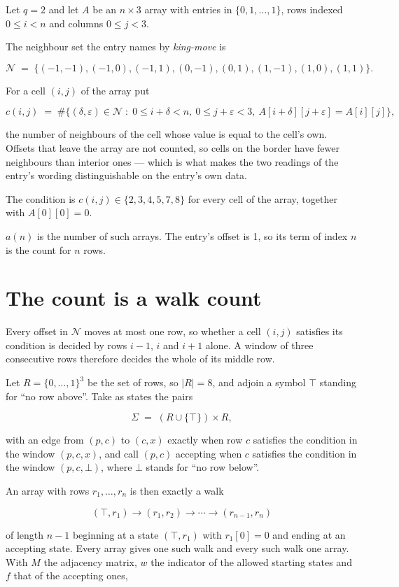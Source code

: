 \documentclass[11pt]{article}
\theoremstyle{definition}
\begin{document}
Let $q = 2$ and let $A$ be an $n \times 3$ array with entries in $\{0,1,\dots,1\}$, rows indexed $0 \le i < n$ and columns $0 \le j < 3$.

The neighbour set the entry names by {\itshape king-move} is

\[\mathcal{N} \;=\; \{(-1,-1), (-1,0), (-1,1), (0,-1), (0,1), (1,-1), (1,0), (1,1)\}.\]

For a cell $(i,j)$ of the array put

\[c(i,j) \;=\; \#\bigl\{(\delta,\varepsilon)\in\mathcal{N} \;:\; 0\le i+\delta<n,\ 0\le j+\varepsilon<3,\ A[i+\delta][j+\varepsilon] = A[i][j]\bigr\},\]

the number of neighbours of the cell whose value is equal to the cell's own. Offsets that leave the array are not counted, so cells on the border have fewer neighbours than interior ones --- which is what makes the two readings of the entry's wording distinguishable on the entry's own data.

The condition is $c(i,j) \in \{2, 3, 4, 5, 7, 8\}$ for every cell of the array, together with $A[0][0]=0$.

$a(n)$ is the number of such arrays. The entry's offset is 1, so its term of index $n$ is the count for $n$ rows.

\section{The count is a walk count}

Every offset in $\mathcal{N}$ moves at most one row, so whether a cell $(i,j)$ satisfies its condition is decided by rows $i-1$, $i$ and $i+1$ alone. A window of three consecutive rows therefore decides the whole of its middle row.

Let $R = \{0,\dots,1\}^{3}$ be the set of rows, so $|R| = 8$, and adjoin a symbol $\top$ standing for ``no row above''. Take as states the pairs

\[\Sigma \;=\; (R \cup \{\top\}) \times R,\]

with an edge from $(p,c)$ to $(c,x)$ exactly when row $c$ satisfies the condition in the window $(p,c,x)$, and call $(p,c)$ accepting when $c$ satisfies the condition in the window $(p,c,\bot)$, where $\bot$ stands for ``no row below''.

An array with rows $r_1,\dots,r_n$ is then exactly a walk

\[(\top,r_1) \to (r_1,r_2) \to \cdots \to (r_{n-1},r_n)\]

of length $n-1$ beginning at a state $(\top,r_1)$ with $r_1[0]=0$ and ending at an accepting state. Every array gives one such walk and every such walk one array. With $M$ the adjacency matrix, $w$ the indicator of the allowed starting states and $f$ that of the accepting ones,
\end{document}
